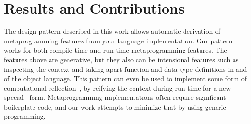 \documentclass[format=acmsmall, review=false, screen=true]{acmart}
\begin{document}
\section{Results and Contributions}

The design pattern described in this work allows automatic derivation of metaprogramming features from your language implementation.
Our pattern works for both compile-time and run-time metaprogramming features.
The features above are generative, but they also can be intensional features
such as inspecting the context and taking apart function and data type
definitions in and of the object language. This pattern can even be used to
implement some form of computational
reflection~\cite{bcSmith,reflectionMasses}, by reifying the context during
run-time for a new special \textlambda\ form.
Metaprogramming implementations often require significant boilerplate code, and
our work attempts to minimize that by using generic programming.






\end{document}
